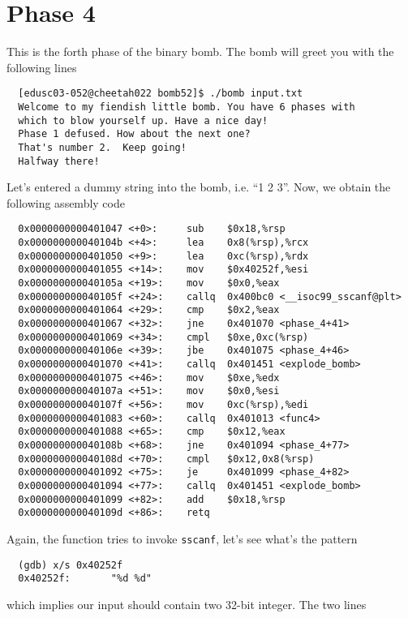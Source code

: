 \section{Phase 4}
This is the forth phase of the binary bomb. The bomb will greet you with the following lines
{\renewcommand\fcolorbox[4][]{\textcolor{black}{\strut#4}}
\begin{verbatim}
  [edusc03-052@cheetah022 bomb52]$ ./bomb input.txt
  Welcome to my fiendish little bomb. You have 6 phases with
  which to blow yourself up. Have a nice day!
  Phase 1 defused. How about the next one?
  That's number 2.  Keep going!
  Halfway there!
\end{verbatim}
}\noindent
Let's entered a dummy string into the bomb, i.e. ``1 2 3''. Now, we obtain the following assembly code
{\renewcommand\fcolorbox[4][]{\textcolor{cyan}{\strut#4}}
\begin{verbatim}
  0x0000000000401047 <+0>:     sub    $0x18,%rsp
  0x000000000040104b <+4>:     lea    0x8(%rsp),%rcx
  0x0000000000401050 <+9>:     lea    0xc(%rsp),%rdx
  0x0000000000401055 <+14>:    mov    $0x40252f,%esi
  0x000000000040105a <+19>:    mov    $0x0,%eax
  0x000000000040105f <+24>:    callq  0x400bc0 <__isoc99_sscanf@plt>
  0x0000000000401064 <+29>:    cmp    $0x2,%eax
  0x0000000000401067 <+32>:    jne    0x401070 <phase_4+41>
  0x0000000000401069 <+34>:    cmpl   $0xe,0xc(%rsp)
  0x000000000040106e <+39>:    jbe    0x401075 <phase_4+46>
  0x0000000000401070 <+41>:    callq  0x401451 <explode_bomb>
  0x0000000000401075 <+46>:    mov    $0xe,%edx
  0x000000000040107a <+51>:    mov    $0x0,%esi
  0x000000000040107f <+56>:    mov    0xc(%rsp),%edi
  0x0000000000401083 <+60>:    callq  0x401013 <func4>
  0x0000000000401088 <+65>:    cmp    $0x12,%eax
  0x000000000040108b <+68>:    jne    0x401094 <phase_4+77>
  0x000000000040108d <+70>:    cmpl   $0x12,0x8(%rsp)
  0x0000000000401092 <+75>:    je     0x401099 <phase_4+82>
  0x0000000000401094 <+77>:    callq  0x401451 <explode_bomb>
  0x0000000000401099 <+82>:    add    $0x18,%rsp
  0x000000000040109d <+86>:    retq
\end{verbatim}
}\noindent
Again, the function tries to invoke \verb+sscanf+, let's see what's the pattern
{\renewcommand\fcolorbox[4][]{\textcolor{cyan}{\strut#4}}
\begin{verbatim}
  (gdb) x/s 0x40252f
  0x40252f:       "%d %d"
\end{verbatim}
}\noindent
which implies our input should contain two 32-bit integer. The two lines
